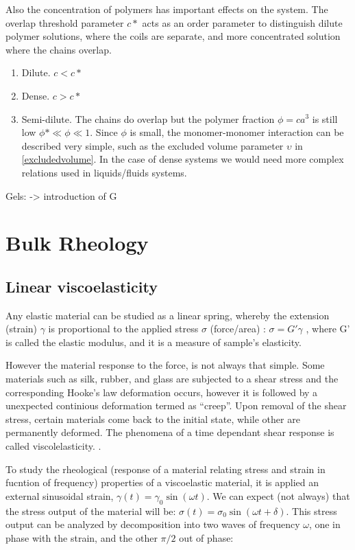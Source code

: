 Also the concentration of polymers has important effects on the system. The
overlap threshold parameter $c*$ acts as an order parameter to distinguish dilute
polymer solutions, where the coils are separate, and more concentrated solution
where the chains overlap.
\begin{enumerate}
  \item Dilute. $c<c*$
  \item Dense. $c>c*$
  \item Semi-dilute. The chains do overlap but the polymer fraction
  $\phi=ca^3$ is still low $\phi*\ll\phi\ll1$. Since $\phi$ is small, the monomer-monomer interaction can
  be described very simple, such as the excluded volume parameter $\upsilon$ in
  \ref{excludedvolume}. In the case of dense systems we would need more complex
  relations used in liquids/fluids systems. 
\end{enumerate}


Gels: -> introduction of G

\section{Bulk Rheology}
\subsection{Linear viscoelasticity}
Any elastic material can be studied as a linear spring, whereby the
extension (strain) $\gamma$ is proportional to the applied stress $\sigma$ (force/area) :
$\sigma=G'\gamma$ , where G' is called the elastic modulus, and it is a measure
of sample's elasticity.

However the material response to the force, is not always that simple. Some
materials such as silk, rubber, and glass are subjected to a shear
stress and the corresponding Hooke's law deformation occurs, however it is
followed by a unexpected continious deformation termed as ``creep''. Upon
removal of the shear stress, certain materials come back to the initial state,
while other are permanently deformed. The phenomena of a time dependant shear
response is called viscolelasticity. \citep{macosko_rheology:_1994}.

To study the rheological (response of a material relating stress
and strain in fucntion of frequency) properties of a viscoelastic material, it
is applied an external sinusoidal strain, $\gamma(t)=\gamma_0\sin(\omega t)$. We
can expect (not always) that the stress output of the material will be:
$\sigma(t) = \sigma_0 \sin(\omega t + \delta)$. This stress output can be
analyzed by decomposition into two waves of frequency $\omega$, one in phase
with the strain, and the other $\pi/2$ out of phase:

